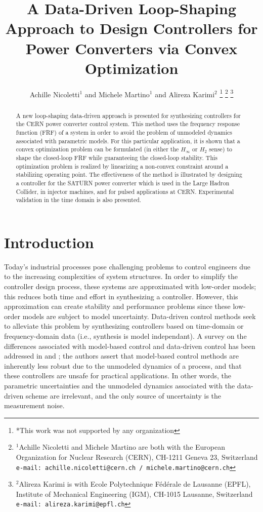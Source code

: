 \documentclass[a4paper, 10pt, conference]{ieeeconf}
\title{A Data-Driven Loop-Shaping Approach to Design Controllers for Power Converters via Convex Optimization}
\author{Achille Nicoletti$^{1}$ and Michele Martino$^{1}$ and Alireza Karimi$^{2}$%
\thanks{*This work was not supported by any organization}%
\thanks{$^{1}$Achille Nicoletti and Michele Martino are both with the European Organization for Nuclear Research (CERN), 
 CH-1211 Geneva 23, Switzerland
        {\tt\small  e-mail: achille.nicoletti@cern.ch / michele.martino@cern.ch}}%
\thanks{$^{2}$Alireza Karimi is with Ecole Polytechnique F\'{e}d\'{e}rale de Lausanne (EPFL), Institute of Mechanical Engineering (IGM),
   CH-1015 Lausanne, Switzerland
        {\tt\small e-mail: alireza.karimi@epfl.ch}}%
}
\begin{document}
\maketitle
\thispagestyle{empty}
\pagestyle{empty}

\begin{abstract}                %
A new loop-shaping data-driven approach is presented for synthesizing controllers for the CERN power converter control system. This method uses the frequency response function (FRF) of a system in order to avoid the problem of unmodeled dynamics associated with parametric models. For this particular application, it is shown that a convex optimization problem can be formulated (in either the $H_\infty$ or $H_2$ sense) to shape the closed-loop FRF while guaranteeing the closed-loop stability. This optimization problem is realized by linearizing a non-convex constraint around a stabilizing operating point. The effectiveness of the method is illustrated by designing a controller for the SATURN power converter which is used in the Large Hadron Collider, in injector machines, and for pulsed applications at CERN. Experimental validation in the time domain is also presented. 
\end{abstract}


\section{Introduction}
Today's industrial processes pose challenging problems to control engineers due to the increasing complexities of system structures. In order to simplify the controller design process, these systems are approximated with low-order models; this reduces both time and effort in synthesizing a controller. However, this approximation can create stability and performance problems since these low-order models are subject to model uncertainty. Data-driven control methods seek to alleviate this problem by synthesizing controllers based on time-domain or frequency-domain data (i.e., synthesis is model independant). A survey on the differences associated with model-based control and data-driven control has been addressed in \cite{HW13} and \cite{BCE12}; the authors assert that model-based control methods are inherently less robust due to the unmodeled dynamics of a process, and that these controllers are unsafe for practical applications. In other words, the parametric uncertainties and the unmodeled dynamics associated with the data-driven scheme are irrelevant, and the only source of uncertainty is the measurement noise. 
\end{document}
